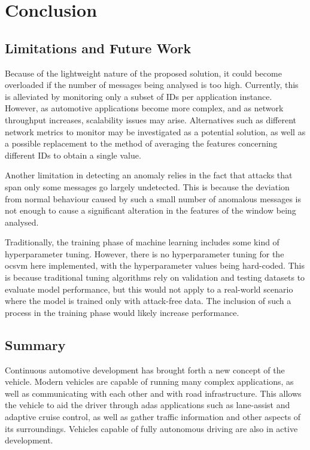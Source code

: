 \chapter{Conclusion}
\label{c:conclusion}

\section{Limitations and Future Work}

Because of the lightweight nature of the proposed solution, it could become overloaded if the number of messages being analysed is too high. Currently, this is alleviated by monitoring only a subset of IDs per application instance. However, as automotive applications become more complex, and as network throughput increases, scalability issues may arise. Alternatives such as different network metrics to monitor may be investigated as a potential solution, as well as a possible replacement to the method of averaging the features concerning different IDs to obtain a single value.\par

Another limitation in detecting an anomaly relies in the fact that attacks that span only some messages go largely undetected. This is because the deviation from normal behaviour caused by such a small number of anomalous messages is not enough to cause a significant alteration in the features of the window being analysed.\par

Traditionally, the training phase of machine learning includes some kind of hyperparameter tuning. However, there is no hyperparameter tuning for the \gls{ocsvm} here implemented, with the hyperparameter values being hard-coded. This is because traditional tuning algorithms rely on validation and testing datasets to evaluate model performance, but this would not apply to a real-world scenario where the model is trained only with attack-free data. The inclusion of such a process in the training phase would likely increase performance.

\section{Summary}

Continuous automotive development has brought forth a new concept of the vehicle. Modern vehicles are capable of running many complex applications, as well as communicating with each other and with road infrastructure. This allows the vehicle to aid the driver through \gls{adas} applications such as lane-assist and adaptive cruise control, as well as gather traffic information and other aspects of its surroundings. Vehicles capable of fully autonomous driving are also in active development.\par


